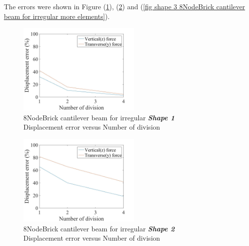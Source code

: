 \documentclass[fleqn,11pt]{article}
\begin{document}
The errors were shown in Figure (\ref{fig shape 1 8NodeBrick cantilever beam for irregular more elements}), (\ref{fig shape 2 8NodeBrick cantilever beam for irregular more elements}) and (\ref{fig shape 3 8NodeBrick cantilever beam for irregular more elements}). 
\begin{figure}[H]
    \centering
    \includegraphics[width=6cm]{../Figure-files/error8brick_beam_irregular_shape1100.jpeg}
  \captionsetup{justification=centering,margin=3cm}
  \caption{8NodeBrick cantilever beam for irregular \emph{\textbf{Shape 1}}\\
      Displacement error   versus   Number of division}
  \label{fig shape 1 8NodeBrick cantilever beam for irregular more elements}
\end{figure}



\begin{figure}[H]
    \centering
    \includegraphics[width=6cm]{../Figure-files/error8brick_beam_irregular_shape2.jpeg}
  \captionsetup{justification=centering,margin=3cm}
  \caption{8NodeBrick cantilever beam for irregular \emph{\textbf{Shape 2}} \\
      Displacement error   versus   Number of division}
  \label{fig shape 2 8NodeBrick cantilever beam for irregular more elements}
\end{figure}
\end{document}
